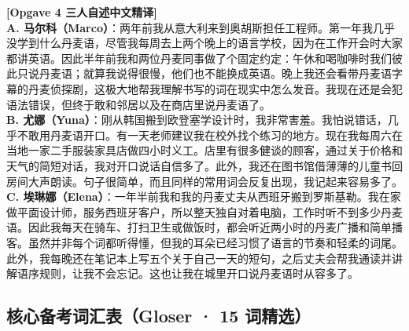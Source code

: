 \begin{transbox}
\small
\textbf{\color{NCDTeal}[Opgave 4 三人自述中文精译]}\\
\textbf{A. 马尔科（Marco）}：两年前我从意大利来到奥胡斯担任工程师。第一年我几乎没学到什么丹麦语，尽管我每周去上两个晚上的语言学校，因为在工作开会时大家都讲英语。因此半年前我和两位丹麦同事做了个固定约定：午休和喝咖啡时我们彼此只说丹麦语；就算我说得很慢，他们也不能换成英语。晚上我还会看带丹麦语字幕的丹麦侦探剧，这极大地帮我理解书写的词在现实中怎么发音。我现在还是会犯语法错误，但终于敢和邻居以及在商店里说丹麦语了。\\
\textbf{B. 尤娜（Yuna）}：刚从韩国搬到欧登塞学设计时，我非常害羞。我怕说错话，几乎不敢用丹麦语开口。有一天老师建议我在校外找个练习的地方。现在我每周六在当地一家二手服装家具店做四小时义工。店里有很多健谈的顾客，通过关于价格和天气的简短对话，我对开口说话自信多了。此外，我还在图书馆借薄薄的儿童书回房间大声朗读。句子很简单，而且同样的常用词会反复出现，我记起来容易多了。\\
\textbf{C. 埃琳娜（Elena）}：一年半前我和我的丹麦丈夫从西班牙搬到罗斯基勒。我在家做平面设计师，服务西班牙客户，所以整天独自对着电脑，工作时听不到多少丹麦语。因此我每天在骑车、打扫卫生或做饭时，都会听近两小时的丹麦广播和简单播客。虽然并非每个词都听得懂，但我的耳朵已经习惯了语言的节奏和轻柔的词尾。此外，我每晚还在笔记本上写五个关于自己一天的短句，之后丈夫会帮我通读并讲解语序规则，让我不会忘记。这也让我在城里开口说丹麦语时从容多了。
\end{transbox}

\subsection*{核心备考词汇表（Gloser · 15 词精选）}

